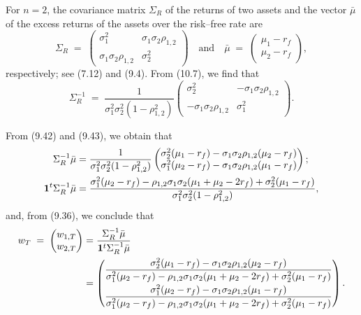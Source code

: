 For $n=2$, the covariance matrix $\Sigma_R$ of the returns of two assets and the
vector $\bar\mu$ of the excess returns of the assets over the risk--free rate are
\begin{equation}
\Sigma_R \;=\; \begin{pmatrix} \sigma_1^2 & \sigma_1\sigma_2\rho_{1,2} \\
\sigma_1\sigma_2\rho_{1,2} & \sigma_2^2 \end{pmatrix} \quad \text{and} \quad
\bar\mu \;=\; \begin{pmatrix} \mu_1-r_f \\ \mu_2-r_f \end{pmatrix},
\end{equation}
respectively; see (7.12) and (9.4). From (10.7), we find that
\begin{equation}
\Sigma_R^{-1} \;=\; \frac{1}{\sigma_1^2\sigma_2^2(1-\rho_{1,2}^2)}
\begin{pmatrix} \sigma_2^2 & -\sigma_1\sigma_2\rho_{1,2} \\ -\sigma_1\sigma_2\rho_{1,2}
& \sigma_1^2 \end{pmatrix}.
\end{equation}

From (9.42) and (9.43), we obtain that
\begin{align*}
\Sigma_R^{-1}\bar\mu &= \frac{1}{\sigma_1^2\sigma_2^2(1-\rho_{1,2}^2)}
\begin{pmatrix} \sigma_2^2(\mu_1-r_f)-\sigma_1\sigma_2\rho_{1,2}(\mu_2-r_f) \\
\sigma_1^2(\mu_2-r_f)-\sigma_1\sigma_2\rho_{1,2}(\mu_1-r_f) \end{pmatrix}; \\
\mathbf{1}^t\Sigma_R^{-1}\bar\mu &= \frac{\sigma_1^2(\mu_2-r_f) -
\rho_{1,2}\sigma_1\sigma_2(\mu_1+\mu_2-2r_f) + \sigma_2^2(\mu_1-r_f)}
{\sigma_1^2\sigma_2^2(1-\rho_{1,2}^2)},
\end{align*}
and, from (9.36), we conclude that
\begin{align*}
w_T \;=\; \begin{pmatrix} w_{1,T} \\ w_{2,T} \end{pmatrix} &= \frac{\Sigma_R^{-1}\bar\mu}
{\mathbf{1}^t\Sigma_R^{-1}\bar\mu} \\
&= \begin{pmatrix}
\dfrac{\sigma_2^2(\mu_1-r_f)-\sigma_1\sigma_2\rho_{1,2}(\mu_2-r_f)}
{\sigma_1^2(\mu_2-r_f)-\rho_{1,2}\sigma_1\sigma_2(\mu_1+\mu_2-2r_f)+\sigma_2^2(\mu_1-r_f)}
\\[2ex]
\dfrac{\sigma_1^2(\mu_2-r_f)-\sigma_1\sigma_2\rho_{1,2}(\mu_1-r_f)}
{\sigma_1^2(\mu_2-r_f)-\rho_{1,2}\sigma_1\sigma_2(\mu_1+\mu_2-2r_f)+\sigma_2^2(\mu_1-r_f)}
\end{pmatrix}.
\end{align*}
